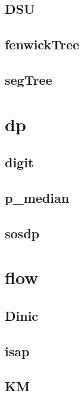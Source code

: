 \documentclass[a4paper,10pt,twocolumn,oneside]{article}
\begin{document}
    \subsection{DSU}
    

    \subsection{fenwickTree}
    

    \subsection{segTree}
    

\section{dp}
    \subsection{digit}
    

    \subsection{p\_median}
    

    \subsection{sosdp}
    

\section{flow}
    \subsection{Dinic}
    

    \subsection{isap}
    

    \subsection{KM}
    
\end{document}
